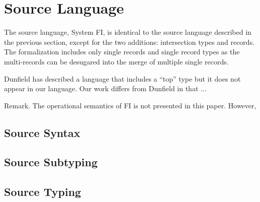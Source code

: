 \section{Source Language}

The source language, System FI, is identical to the source language described in
the previous section, except for the two additions: intersection types and
records. The formalization includes only single records and single record types as the multi-records can be desugared into the merge of multiple single records.

Dunfield has described a language that includes a ``top'' type but it does not appear in our language. Our work differs from Dunfield in that ...

Remark. The operational semantics of FI is not presented in this paper. However,

\subsection{Source Syntax}

\subsection{Source Subtyping}

\subsection{Source Typing}
